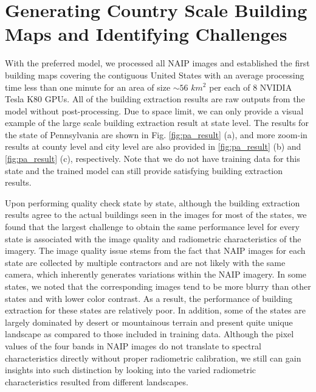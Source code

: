 \documentclass[journal]{IEEEtran}
\begin{document}
\section{Generating Country Scale Building Maps and Identifying Challenges}
With the preferred model, we processed all NAIP images and established the first building maps covering the contiguous United States with an average processing time less than one minute for an area of size $\sim56$ $km^2$ per each of 8 NVIDIA Tesla K80 GPUs. All of the building extraction results are raw outputs from the model without post-processing. Due to space limit, we can only provide a visual example of the large scale building extraction result at state level. The results for the state of Pennsylvania are shown in Fig. \ref{fig:pa_result} (a),  and more zoom-in results at county level and city level are also provided in \ref{fig:pa_result} (b) and \ref{fig:pa_result} (c), respectively. Note that we do not have training data for this state and the trained model can still provide satisfying building extraction results.

Upon performing quality check state by state, although the building extraction results agree to the actual buildings seen in the images for most of the states, we found that the largest challenge to obtain the same performance level for every state is associated with the image quality and radiometric characteristics of the imagery. The image quality issue stems from the fact that NAIP images for each state are collected by multiple contractors and are not likely with the same camera, which inherently generates variations within the NAIP imagery. In some states, we noted that the corresponding images tend to be more blurry than other states and with lower color contrast. As a result, the performance of building extraction for these states are relatively poor. In addition, some of the states are largely dominated by desert or mountainous terrain and present quite unique landscape as compared to those included in training data. Although the pixel values of the four bands in NAIP images do not translate to spectral characteristics directly without proper radiometric calibration, we still can gain insights into such distinction by looking into the varied radiometric characteristics resulted from different landscapes. 
\begin{figure*}
    \centering
    \label{pa_state}
        \label{pa_county}
        \label{pa_city}
  \caption{The building extraction results in magenta for (a) the state of Pennsylvania, (b) the city area of Philadelphia county, which is the yellow polygon in (a). The red lines in (c) delineate the extracted building outlines over the downtown area of Philadelphia (blue box in (b))}
  \label{fig:pa_result} 
\end{figure*}
\end{document}
